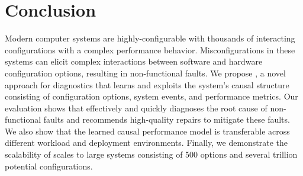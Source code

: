 \section{Conclusion}
\label{sect:conclusion}

Modern computer systems are highly-configurable with thousands of interacting configurations with a complex performance behavior. Misconfigurations in these systems can elicit complex interactions between software and hardware configuration options, resulting in non-functional faults. We propose \ourapproach, a novel approach for diagnostics that learns and exploits the system's causal structure consisting of configuration options, system events, and performance metrics. Our evaluation shows that \ourapproach effectively and quickly diagnoses the root cause of non-functional faults and recommends high-quality repairs to mitigate these faults. We also show that the learned causal performance model is transferable across different workload and deployment environments. Finally, we demonstrate the scalability of \ourapproach scales to large systems consisting of 500 options and several trillion potential configurations. 




